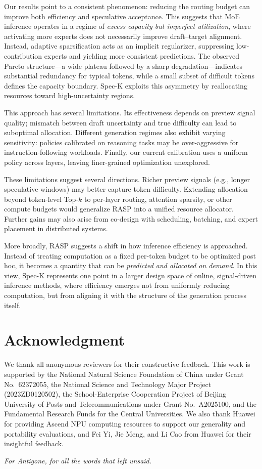 \documentclass[conference]{IEEEtran}
\theoremstyle{definition} %
\begin{document}
Our results point to a consistent phenomenon: reducing the routing budget can improve both efficiency and speculative acceptance. This suggests that MoE inference operates in a regime of \emph{excess capacity but imperfect utilization}, where activating more experts does not necessarily improve draft--target alignment. Instead, adaptive sparsification acts as an implicit regularizer, suppressing low-contribution experts and yielding more consistent predictions. The observed Pareto structure---a wide plateau followed by a sharp degradation---indicates substantial redundancy for typical tokens, while a small subset of difficult tokens defines the capacity boundary. Spec-K exploits this asymmetry by reallocating resources toward high-uncertainty regions.

This approach has several limitations. Its effectiveness depends on preview signal quality; mismatch between draft uncertainty and true difficulty can lead to suboptimal allocation. Different generation regimes also exhibit varying sensitivity: policies calibrated on reasoning tasks may be over-aggressive for instruction-following workloads. Finally, our current calibration uses a uniform policy across layers, leaving finer-grained optimization unexplored.

These limitations suggest several directions. Richer preview signals (e.g., longer speculative windows) may better capture token difficulty. Extending allocation beyond token-level Top-$k$ to per-layer routing, attention sparsity, or other compute budgets would generalize RASP into a unified resource allocator. Further gains may also arise from co-design with scheduling, batching, and expert placement in distributed systems.

More broadly, RASP suggests a shift in how inference efficiency is approached. Instead of treating computation as a fixed per-token budget to be optimized post hoc, it becomes a quantity that can be \emph{predicted and allocated on demand}. In this view, Spec-K represents one point in a larger design space of online, signal-driven inference methods, where efficiency emerges not from uniformly reducing computation, but from aligning it with the structure of the generation process itself.

\section*{Acknowledgment}
We thank all anonymous reviewers for their constructive feedback. This work is supported by the National Natural Science Foundation of China under Grant No.~62372055, the National Science and Technology Major Project (2023ZD0120502), the School-Enterprise Cooperation Project of Beijing University of Posts and Telecommunications under Grant No.~A2025100, and the Fundamental Research Funds for the Central Universities. We also thank Huawei for providing Ascend NPU computing resources to support our generality and portability evaluations, and Fei Yi, Jie Meng, and Li Cao from Huawei for their insightful feedback.

\emph{For Antigone, for all the words that left unsaid.}




\end{document}
